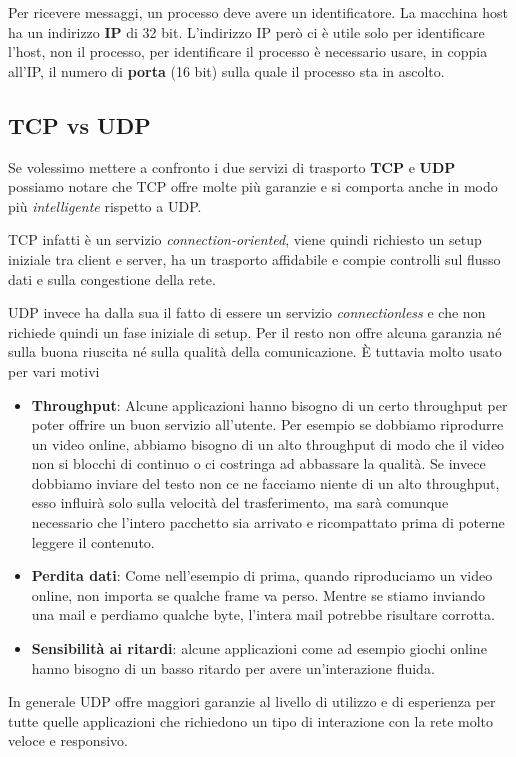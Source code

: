 Per ricevere messaggi, un processo deve avere un identificatore. La 
macchina host ha un indirizzo \textbf{IP} di 32 bit. L'indirizzo IP 
però ci è utile solo per identificare l'host, non il processo, per 
identificare il processo è necessario usare, in coppia all'IP, il 
numero di \textbf{porta} (16 bit) sulla quale il processo sta in 
ascolto.

\subsection{TCP vs UDP}
Se volessimo mettere a confronto i due servizi di trasporto 
\textbf{TCP} e \textbf{UDP} possiamo notare che TCP offre molte più 
garanzie e si comporta anche in modo più \emph{intelligente} rispetto 
a UDP.

TCP infatti è un servizio \emph{connection-oriented}, viene quindi 
richiesto un setup iniziale tra client e server, ha un trasporto 
affidabile e compie controlli sul flusso dati e sulla congestione 
della rete.

UDP invece ha dalla sua il fatto di essere un servizio 
\emph{connectionless} e che non richiede quindi un fase iniziale di 
setup. Per il resto non offre alcuna garanzia né sulla buona riuscita
né sulla qualità della comunicazione. \`E tuttavia molto usato per 
vari motivi
\begin{itemize}
	\item \textbf{Throughput}: Alcune applicazioni hanno bisogno di un 
		certo throughput per poter offrire un buon servizio all'utente.
		Per esempio se dobbiamo riprodurre un video online, abbiamo 
		bisogno di un alto throughput di modo che il video non si 
		blocchi di continuo o ci costringa ad abbassare la qualità. Se
		invece dobbiamo inviare del testo non ce ne facciamo niente di
		un alto throughput, esso influirà solo sulla velocità del 
		trasferimento, ma sarà comunque necessario che l'intero 
		pacchetto sia arrivato e ricompattato prima di poterne leggere 
		il contenuto.
	\item \textbf{Perdita dati}: Come nell'esempio di prima, quando 
		riproduciamo un video online, non importa se qualche frame va 
		perso. Mentre se stiamo inviando una mail e perdiamo qualche 
		byte, l'intera mail potrebbe risultare corrotta.
	\item \textbf{Sensibilità ai ritardi}: alcune applicazioni come 
		ad esempio giochi online hanno bisogno di un basso ritardo per
		avere un'interazione fluida.
\end{itemize}
In generale UDP offre maggiori garanzie al livello di utilizzo e di 
esperienza per tutte quelle applicazioni che richiedono un tipo di 
interazione con la rete molto veloce e responsivo.

